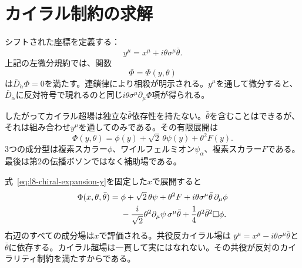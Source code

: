 \section{カイラル制約の求解}

シフトされた座標を定義する：
\begin{equation}
y^\mu=x^\mu+i\theta\sigma^\mu\bar\theta.
\label{eq:l8-chiral-coordinate}
\end{equation}
上記の左微分規約では、関数
\begin{equation}
\Phi=\Phi(y,\theta)
\label{eq:l8-chiral-solution}
\end{equation}
は\(\bar D_{\dot\alpha}\Phi=0\)を満たす。連鎖律により相殺が明示される。\(y^\mu\)を通して微分すると、\(\bar D_{\dot\alpha}\)に反対符号で現れるのと同じ\(i\theta\sigma^\mu\partial_\mu\Phi\)項が得られる。

したがってカイラル超場は独立な\(\bar\theta\)依存性を持たない。\(\bar\theta\)を含むことはできるが、それは組み合わせ\(y^\mu\)を通してのみである。その有限展開は
\begin{equation}
\Phi(y,\theta)
=\phi(y)+\sqrt2\,\theta\psi(y)+\theta^2F(y).
\label{eq:l8-chiral-expansion-y}
\end{equation}
3つの成分型は複素スカラー\(\phi\)、ワイルフェルミオン\(\psi_\alpha\)、複素スカラー\(F\)である。最後は第2の伝播ボソンではなく補助場である。

\begin{classroomqa}
\end{classroomqa}

式~\eqref{eq:l8-chiral-expansion-y}を固定した\(x\)で展開すると
\begin{align}
\Phi(x,\theta,\bar\theta)
={}&\phi
+\sqrt2\,\theta\psi
+\theta^2F
+i\theta\sigma^\mu\bar\theta\,\partial_\mu\phi
\notag\\
&-\frac{i}{\sqrt2}\theta^2
\partial_\mu\psi\,\sigma^\mu\bar\theta
+\frac14\theta^2\bar\theta^2\Box\phi.
\label{eq:l8-chiral-expansion-x}
\end{align}
右辺のすべての成分場は\(x\)で評価される。共役反カイラル場は
\(\bar y^\mu=x^\mu-i\theta\sigma^\mu\bar\theta\)と\(\bar\theta\)に依存する。カイラル超場は一貫して実にはなれない。その共役が反対のカイラリティ制約を満たすからである。

